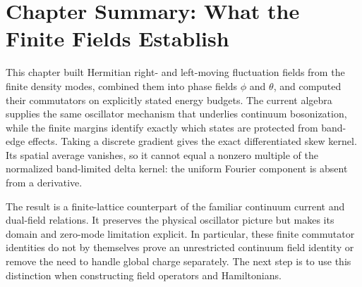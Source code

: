 \section{Chapter Summary: What the Finite Fields Establish}
This chapter built Hermitian right- and left-moving fluctuation fields from
the finite density modes, combined them into phase fields $\phi$ and
$\theta$, and computed their commutators on explicitly stated energy
budgets. The current algebra supplies the same oscillator mechanism that
underlies continuum bosonization, while the finite margins identify exactly
which states are protected from band-edge effects. Taking a discrete
gradient gives the exact differentiated skew kernel. Its spatial average
vanishes, so it cannot equal a nonzero multiple of the normalized
band-limited delta kernel: the uniform Fourier component is absent from a
derivative.

The result is a finite-lattice counterpart of the familiar continuum
current and dual-field relations. It preserves the physical oscillator
picture but makes its domain and zero-mode limitation explicit. In
particular, these finite commutator identities do not by themselves prove
an unrestricted continuum field identity or remove the need to handle
global charge separately. The next step is to use this distinction when
constructing field operators and Hamiltonians.
